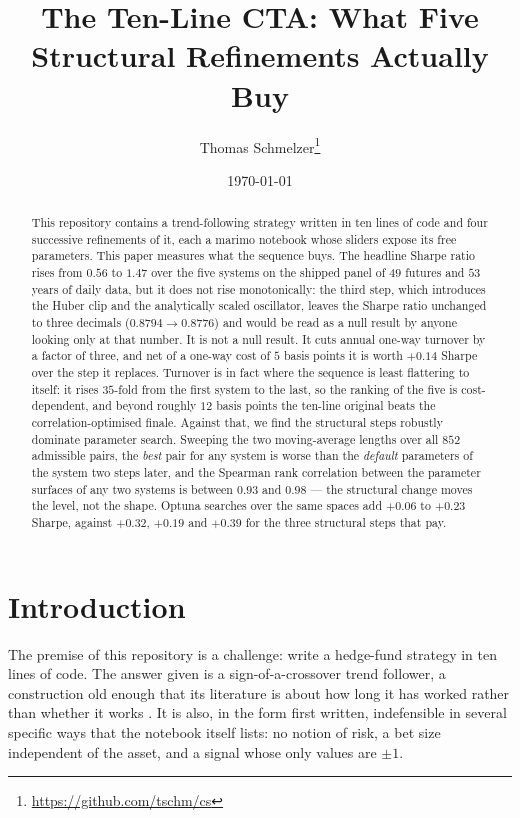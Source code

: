 \documentclass[11pt,a4paper]{article}
\title{The Ten-Line CTA: What Five Structural Refinements Actually Buy}
\author{Thomas Schmelzer\thanks{\url{https://github.com/tschm/cs}}}
\date{\today}
\begin{document}
\maketitle

\begin{abstract}
This repository contains a trend-following strategy written in ten lines of
code and four successive refinements of it, each a marimo notebook whose
sliders expose its free parameters. This paper measures what the sequence
buys. The headline Sharpe ratio rises from $0.56$ to $1.47$ over the five
systems on the shipped panel of $49$ futures and $53$ years of daily data, but
it does not rise monotonically: the third step, which introduces the Huber
clip and the analytically scaled oscillator, leaves the Sharpe ratio unchanged
to three decimals ($0.8794 \to 0.8776$) and would be read as a null result by
anyone looking only at that number. It is not a null result. It cuts annual
one-way turnover by a factor of three, and net of a one-way cost of $5$ basis
points it is worth $+0.14$ Sharpe over the step it replaces. Turnover is in
fact where the sequence is least flattering to itself: it rises $35$-fold from
the first system to the last, so the ranking of the five is cost-dependent,
and beyond roughly $12$ basis points the ten-line original beats the
correlation-optimised finale. Against that, we find the structural steps
robustly dominate parameter search. Sweeping the two moving-average lengths
over all $852$ admissible pairs, the \emph{best} pair for any system is worse
than the \emph{default} parameters of the system two steps later, and the
Spearman rank correlation between the parameter surfaces of any two systems is
between $0.93$ and $0.98$ --- the structural change moves the level, not the
shape. Optuna searches over the same spaces add $+0.06$ to $+0.23$ Sharpe,
against $+0.32$, $+0.19$ and $+0.39$ for the three structural steps that pay.
\end{abstract}

\section{Introduction}

The premise of this repository is a challenge: write a hedge-fund strategy in
ten lines of code. The answer given is a sign-of-a-crossover trend follower, a
construction old enough that its literature is about how long it has worked
\citep{hurst2017} rather than whether it works \citep{moskowitz2012}. It is
also, in the form first written, indefensible in several specific ways that
the notebook itself lists: no notion of risk, a bet size independent of the
asset, and a signal whose only values are $\pm 1$.
\end{document}
